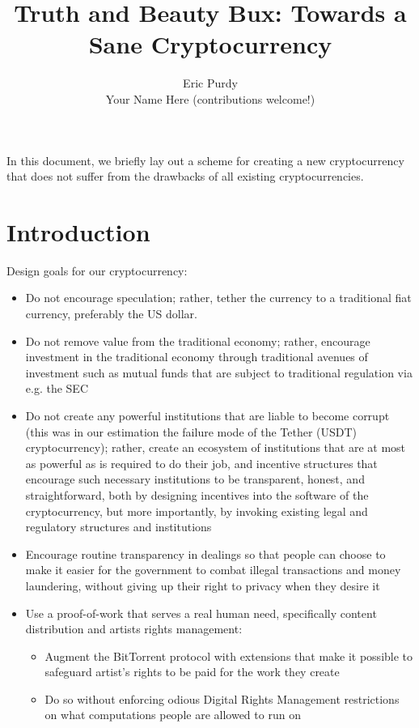 \documentclass{article}
\title{Truth and Beauty Bux: Towards a Sane Cryptocurrency}
\author{Eric Purdy \\ Your Name Here (contributions welcome!)}
\begin{document}
\maketitle

In this document, we briefly lay out a scheme for creating a new
cryptocurrency that does not suffer from the drawbacks of all existing
cryptocurrencies.

\section{Introduction}

Design goals for our cryptocurrency:
\begin{itemize}
\item Do not encourage speculation; rather, tether the currency to a
  traditional fiat currency, preferably the US dollar.
\item Do not remove value from the traditional economy; rather,
  encourage investment in the traditional economy through traditional
  avenues of investment such as mutual funds that are subject to
  traditional regulation via e.g. the SEC
\item Do not create any powerful institutions that are liable to
  become corrupt (this was in our estimation the failure mode of the
  Tether (USDT) cryptocurrency); rather, create an ecosystem of
  institutions that are at most as powerful as is required to do their
  job, and incentive structures that encourage such necessary
  institutions to be transparent, honest, and straightforward, both by
  designing incentives into the software of the cryptocurrency, but
  more importantly, by invoking existing legal and regulatory
  structures and institutions
\item Encourage routine transparency in dealings so that people can
  choose to make it easier for the government to combat illegal
  transactions and money laundering, without giving up their right to
  privacy when they desire it
\item Use a proof-of-work that serves a real human need, specifically
  content distribution and artists rights management:
  \begin{itemize}
    \item Augment the BitTorrent protocol with extensions that make it
      possible to safeguard artist's rights to be paid for the work
      they create
    \item Do so without enforcing odious Digital Rights Management
      restrictions on what computations people are allowed to run on

\end{itemize}
\end{itemize}
\end{document}
